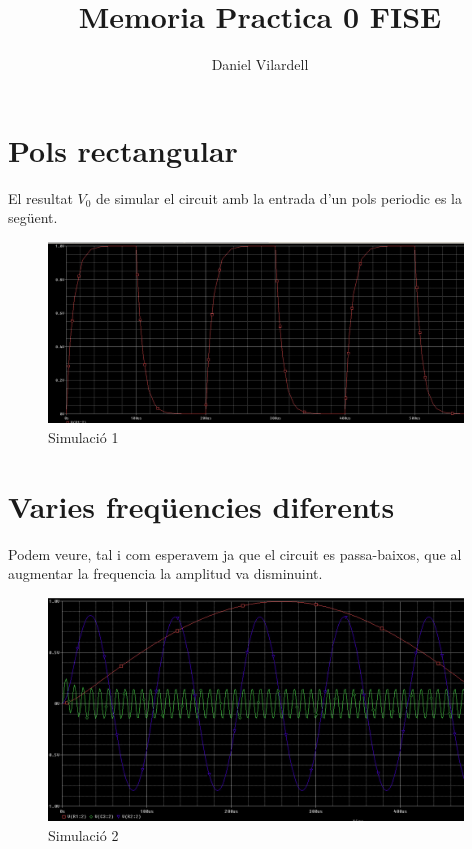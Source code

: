 \documentclass[12pt, a4papre]{article}
\author{Daniel Vilardell}
\title{Memoria Practica 0 FISE}
\date{}
\begin{document}
	\maketitle
	\tableofcontents
	\newpage
	\section{Pols rectangular}
	
	El resultat $V_0$ de simular el circuit amb la entrada d'un pols periodic es la següent.
	
	\begin{figure}[H]
		\begin{center}
		\includegraphics[width=110mm]{Pr0_1.jpeg}
		\caption{Simulació 1}
		\end{center}
	\end{figure}

	\section{Varies freqüencies diferents}

	Podem veure, tal i com esperavem ja que el circuit es passa-baixos, que al augmentar la frequencia la amplitud va disminuint.
	
	\begin{figure}[H]
		\begin{center}
		\includegraphics[width=110mm]{Pr0_2.jpeg}
		\caption{Simulació 2}
		\end{center}
	\end{figure}
	
\end{document}
